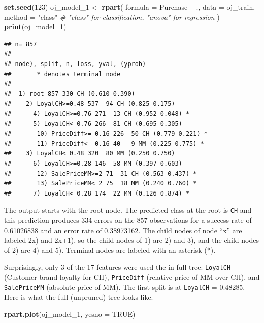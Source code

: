 \documentclass[
]{book}
\newenvironment{Shaded}{\begin{snugshade}}{\end{snugshade}}
\newcommand{\CommentTok}[1]{\textcolor[rgb]{0.56,0.35,0.01}{\textit{#1}}}
\newcommand{\DataTypeTok}[1]{\textcolor[rgb]{0.13,0.29,0.53}{#1}}
\newcommand{\DecValTok}[1]{\textcolor[rgb]{0.00,0.00,0.81}{#1}}
\newcommand{\KeywordTok}[1]{\textcolor[rgb]{0.13,0.29,0.53}{\textbf{#1}}}
\newcommand{\NormalTok}[1]{#1}
\newcommand{\OperatorTok}[1]{\textcolor[rgb]{0.81,0.36,0.00}{\textbf{#1}}}
\newcommand{\OtherTok}[1]{\textcolor[rgb]{0.56,0.35,0.01}{#1}}
\newcommand{\StringTok}[1]{\textcolor[rgb]{0.31,0.60,0.02}{#1}}
\begin{document}
\begin{Shaded}
\begin{Highlighting}[]
\KeywordTok{set.seed}\NormalTok{(}\DecValTok{123}\NormalTok{)}
\NormalTok{oj_model_}\DecValTok{1}\NormalTok{ <-}\StringTok{ }\KeywordTok{rpart}\NormalTok{(}
   \DataTypeTok{formula =}\NormalTok{ Purchase }\OperatorTok{~}\StringTok{ }\NormalTok{.,}
   \DataTypeTok{data =}\NormalTok{ oj_train,}
   \DataTypeTok{method =} \StringTok{"class"}  \CommentTok{# "class" for classification, "anova" for regression}
\NormalTok{   )}
\KeywordTok{print}\NormalTok{(oj_model_}\DecValTok{1}\NormalTok{)}
\end{Highlighting}
\end{Shaded}

\begin{verbatim}
## n= 857 
## 
## node), split, n, loss, yval, (yprob)
##       * denotes terminal node
## 
##  1) root 857 330 CH (0.610 0.390)  
##    2) LoyalCH>=0.48 537  94 CH (0.825 0.175)  
##      4) LoyalCH>=0.76 271  13 CH (0.952 0.048) *
##      5) LoyalCH< 0.76 266  81 CH (0.695 0.305)  
##       10) PriceDiff>=-0.16 226  50 CH (0.779 0.221) *
##       11) PriceDiff< -0.16 40   9 MM (0.225 0.775) *
##    3) LoyalCH< 0.48 320  80 MM (0.250 0.750)  
##      6) LoyalCH>=0.28 146  58 MM (0.397 0.603)  
##       12) SalePriceMM>=2 71  31 CH (0.563 0.437) *
##       13) SalePriceMM< 2 75  18 MM (0.240 0.760) *
##      7) LoyalCH< 0.28 174  22 MM (0.126 0.874) *
\end{verbatim}

The output starts with the root node. The predicted class at the root is \texttt{CH} and this prediction produces 334 errors on the 857 observations for a success rate of 0.61026838 and an error rate of 0.38973162. The child nodes of node ``x'' are labeled 2x) and 2x+1), so the child nodes of 1) are 2) and 3), and the child nodes of 2) are 4) and 5). Terminal nodes are labeled with an asterisk (*).

Surprisingly, only 3 of the 17 features were used the in full tree: \texttt{LoyalCH} (Customer brand loyalty for CH), \texttt{PriceDiff} (relative price of MM over CH), and \texttt{SalePriceMM} (absolute price of MM). The first split is at \texttt{LoyalCH} = 0.48285. Here is what the full (unpruned) tree looks like.

\begin{Shaded}
\begin{Highlighting}[]
\KeywordTok{rpart.plot}\NormalTok{(oj_model_}\DecValTok{1}\NormalTok{, }\DataTypeTok{yesno =} \OtherTok{TRUE}\NormalTok{)}
\end{Highlighting}
\end{Shaded}
\end{document}
